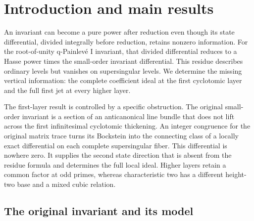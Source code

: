 \section{Introduction and main results}
\label{intro:section}

An invariant can become a pure power after reduction even though its
state differential, divided integrally before reduction, retains
nonzero information. For the root-of-unity q-Painlev\'e I invariant,
that divided differential reduces to a Hasse power times the
small-order invariant differential. This residue describes ordinary
levels but vanishes on supersingular levels. We determine the missing
vertical information: the complete coefficient ideal at the first
cyclotomic layer and the full first jet at every higher layer.

The first-layer result is controlled by a specific obstruction. The
original small-order invariant is a section of an anticanonical line
bundle that does not lift across the first infinitesimal cyclotomic
thickening. An integer congruence for the original matrix trace turns
its Bockstein into the connecting class of a locally exact differential
on each complete supersingular fiber. This differential is nowhere
zero. It supplies the second state direction that is absent from the
residue formula and determines the full local ideal. Higher layers
retain a common factor at odd primes, whereas characteristic two has
a different height-two base and a mixed cubic relation.

\subsection{The original invariant and its model}

